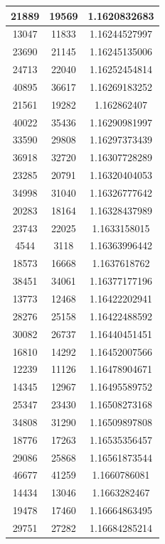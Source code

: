 \documentclass[12pt,a4paper,oneside]{extarticle}
\begin{document}
\begin{table}[ht!]
\begin{tabular}{|c|c|c|}
        21889 & 19569 & 1.1620832683 \\ \hline 
        13047 & 11833 & 1.16244527997 \\ \hline 
        23690 & 21145 & 1.16245135006 \\ \hline 
        24713 & 22040 & 1.16252454814 \\ \hline 
        40895 & 36617 & 1.16269183252 \\ \hline 
        21561 & 19282 & 1.162862407 \\ \hline 
        40022 & 35436 & 1.16290981997 \\ \hline 
        33590 & 29808 & 1.16297373439 \\ \hline 
        36918 & 32720 & 1.16307728289 \\ \hline 
        23285 & 20791 & 1.16320404053 \\ \hline 
        34998 & 31040 & 1.16326777642 \\ \hline 
        20283 & 18164 & 1.16328437989 \\ \hline 
        23743 & 22025 & 1.1633158015 \\ \hline 
        4544 & 3118 & 1.16363996442 \\ \hline 
        18573 & 16668 & 1.1637618762 \\ \hline 
        38451 & 34061 & 1.16377177196 \\ \hline 
        13773 & 12468 & 1.16422202941 \\ \hline 
        28276 & 25158 & 1.16422488592 \\ \hline 
        30082 & 26737 & 1.16440451451 \\ \hline 
        16810 & 14292 & 1.16452007566 \\ \hline 
        12239 & 11126 & 1.16478904671 \\ \hline 
        14345 & 12967 & 1.16495589752 \\ \hline 
        25347 & 23430 & 1.16508273168 \\ \hline 
        34808 & 31290 & 1.16509897808 \\ \hline 
        18776 & 17263 & 1.16535356457 \\ \hline 
        29086 & 25868 & 1.16561873544 \\ \hline 
        46677 & 41259 & 1.1660786081 \\ \hline 
        14434 & 13046 & 1.1663282467 \\ \hline 
        19478 & 17460 & 1.16664863495 \\ \hline 
        29751 & 27282 & 1.16684285214 \\ \hline 

\end{tabular}
\end{table}
\end{document}
